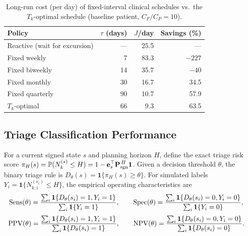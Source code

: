 \documentclass[pdflatex,sn-mathphys-num]{sn-jnl}
\theoremstyle{definition}
\newcommand{\Prob}{\mathbb{P}}
\numberwithin{equation}{section}
\begin{document}
\begin{table}[htbp]
\centering
\caption{Long-run cost (per day) of fixed-interval clinical schedules vs.\ the $T_k$-optimal schedule (baseline patient, $C_F/C_P=10$).}
\label{tab:fixed_vs_adaptive}
\small
\begin{tabular}{lrrr}
\toprule
Policy & $\tau$ (days) & $J$/day & Savings (\%) \\
\midrule
Reactive (wait for excursion) & --- & 25.5 & --- \\
Fixed weekly                  & 7   & 83.3 & $-227$ \\
Fixed biweekly                & 14  & 35.7 & $-40$ \\
Fixed monthly                 & 30  & 16.7 & 34.5 \\
Fixed quarterly               & 90  & 10.7 & 57.9 \\
$T_k$-optimal                 & 66  &  9.3 & 63.5 \\
\bottomrule
\end{tabular}
\end{table}

\subsection{Triage Classification Performance}\label{sec:case_triage}

For a current signed state \(s\) and planning horizon \(H\), define the exact
triage risk score
$\displaystyle \pi_H(s)
=
\Prob(N_k^{(s)}\le H)
=
1-\mathbf e_s^\top \mathbf P_{\rm sgn}^{\,H}\mathbf 1$.
Given a decision threshold \(\theta\), the binary triage rule is
$\displaystyle D_\theta(s)
=
\mathbf 1\{\pi_H(s)\ge \theta\}$.
For simulated labels
$\displaystyle Y_i=\mathbf 1\{N_{k,i}^{(s_i)}\le H\}$,
the empirical operating characteristics are
\[
{\rm Sens}(\theta)
=
\frac{\sum_i\mathbf 1\{D_\theta(s_i)=1,Y_i=1\}}
{\sum_i\mathbf 1\{Y_i=1\}},\qquad
{\rm Spec}(\theta)
=
\frac{\sum_i\mathbf 1\{D_\theta(s_i)=0,Y_i=0\}}
{\sum_i\mathbf 1\{Y_i=0\}},
\]
\[
{\rm PPV}(\theta)
=
\frac{\sum_i\mathbf 1\{D_\theta(s_i)=1,Y_i=1\}}
{\sum_i\mathbf 1\{D_\theta(s_i)=1\}},\qquad
{\rm NPV}(\theta)
=
\frac{\sum_i\mathbf 1\{D_\theta(s_i)=0,Y_i=0\}}
{\sum_i\mathbf 1\{D_\theta(s_i)=0\}}.
\]
\end{document}
